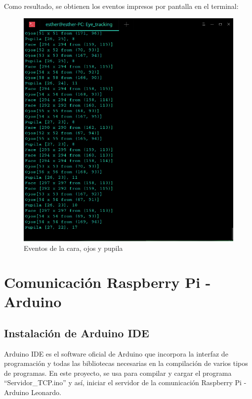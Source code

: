Como resultado, se obtienen los eventos impresos por pantalla en el terminal:

    \begin{figure}[H]
    \centering
    \includegraphics[scale = 0.5]{capitulo_04/figuras_dir/eventos.jpg}
    \caption{Eventos de la cara, ojos y pupila}
    \end{figure}

\clearpage
\section{Comunicación Raspberry Pi - Arduino} \label{s4_4}

\subsection{Instalación de Arduino IDE} \label{s4_4_1}

Arduino IDE es el software oficial de Arduino que incorpora la interfaz de programación y todas las bibliotecas necesarias en la compilación de varios tipos de programas. En este proyecto, se usa para compilar y cargar el programa ``Servidor\_TCP.ino'' y así, iniciar el servidor de la comunicación Raspberry Pi - Arduino Leonardo.

